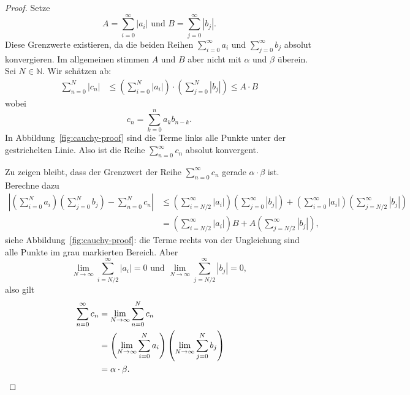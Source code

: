 \documentclass[../main.tex]{subfiles}
\begin{document}

\begin{proof}
  Setze
  \[
    A = \sum_{i=0}^{\infty} |a_i| \text{ und }
    B = \sum_{j=0}^{\infty} |b_j|.
  \]
  Diese Grenzwerte existieren, da die beiden Reihen
  $\sum_{i=0}^{\infty} a_i$ und $\sum_{j=0}^{\infty} b_j$ 
  absolut konvergieren. Im allgemeinen stimmen $A$ und $B$
  aber nicht mit $\alpha$ und $\beta$ überein.
  Sei $N \in \mathbb{N}$. Wir schätzen ab:
  \begin{align*}
    \sum_{n=0}^{N} |c_n| &
    \leq \left(\sum_{i=0}^{N} |a_i|\right)
    \cdot \left( \sum_{j=0}^{N} |b_j| \right) \leq A \cdot B
  \end{align*}
  wobei
  \[
    c_n = \sum_{k=0}^{n} a_k b_{n-k}.
  \]
  In Abbildung~\ref{fig:cauchy-proof}
  sind die Terme links alle
  Punkte unter der
  gestrichelten Linie.
  Also ist die Reihe $\sum_{n=0}^{\infty} c_n$ absolut
  konvergent.

  Zu zeigen bleibt, dass der Grenzwert der Reihe
  $\sum_{n=0}^{\infty} c_n$ gerade $\alpha \cdot \beta$ 
  ist. Berechne dazu
  \begin{align*}
    \left| \left( \sum_{i=0}^{N} a_i \right)
    \left( \sum_{j=0}^{N} b_j \right) - \sum_{n=0}^{N} c_n \right| 
    & \leq \left(\sum_{i=N/2}^{\infty} |a_i| \right)
     \left( \sum_{j=0}^{\infty} |b_j| \right)
     + \left( \sum_{i=0}^{\infty} |a_i| \right)
     \left( \sum_{j=N/2}^{\infty} |b_j| \right)\\
    &= \left( \sum_{i=N/2}^{\infty} |a_i| \right) B
    + A \left( \sum_{j=N/2}^{\infty} |b_j| \right),
  \end{align*}
  siehe Abbildung~\ref{fig:cauchy-proof}: die
  Terme rechts von der Ungleichung sind alle Punkte
  im grau markierten Bereich.
  Aber
  \[
    \lim_{N \to \infty} \sum_{i=N/2}^{\infty} |a_i| = 0
    \text{ und }
    \lim_{N \to \infty} \sum_{j=N/2}^{\infty} |b_j| = 0,
  \]
  also gilt
  \begin{align*}
    \sum_{n=0}^{\infty} c_n 
    & = \lim_{N \to \infty} \sum_{n=0}^{N} c_n \\
    & = \left( \lim_{N \to \infty}\sum_{i=0}^{N} a_i \right)
    \left( \lim_{N \to \infty}\sum_{j=0}^{N} b_j \right) \\
    & = \alpha \cdot \beta. && \qedhere
  \end{align*}
\end{proof}
\end{document}
